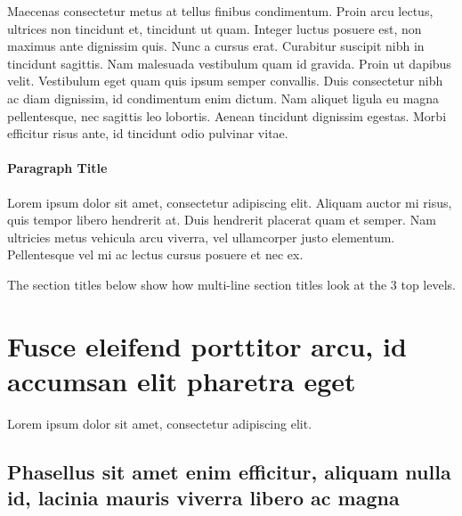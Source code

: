 Maecenas consectetur metus at tellus finibus condimentum. Proin arcu lectus, ultrices non tincidunt et, tincidunt ut quam. Integer luctus posuere est, non maximus ante dignissim quis. Nunc a cursus erat. Curabitur suscipit nibh in tincidunt sagittis. Nam malesuada vestibulum quam id gravida. Proin ut dapibus velit. Vestibulum eget quam quis ipsum semper convallis. Duis consectetur nibh ac diam dignissim, id condimentum enim dictum. Nam aliquet ligula eu magna pellentesque, nec sagittis leo lobortis. Aenean tincidunt dignissim egestas. Morbi efficitur risus ante, id tincidunt odio pulvinar vitae.

\paragraph{Paragraph Title} %

Lorem ipsum dolor sit amet, consectetur adipiscing elit. Aliquam auctor mi risus, quis tempor libero hendrerit at. Duis hendrerit placerat quam et semper. Nam ultricies metus vehicula arcu viverra, vel ullamcorper justo elementum. Pellentesque vel mi ac lectus cursus posuere et nec ex.

The section titles below show how multi-line section titles look at the 3 top levels.

\section[Short version of long section title]{Fusce eleifend porttitor arcu, id accumsan elit pharetra eget} %

Lorem ipsum dolor sit amet, consectetur adipiscing elit. 

\subsection[Short version of long subsection title]{Phasellus sit amet enim efficitur, aliquam nulla id, lacinia mauris viverra libero ac magna}

